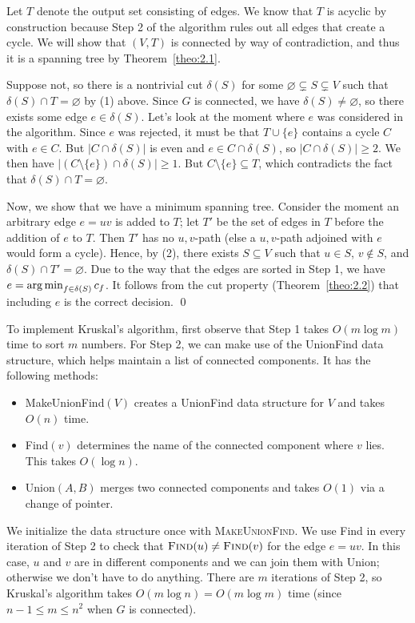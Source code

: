 \begin{pf}
    Let $T$ denote the output set consisting of edges. We know that $T$ is 
    acyclic by construction because Step 2 of the algorithm rules 
    out all edges that create a cycle. We will show that $(V, T)$ is 
    connected by way of contradiction, and thus it is a spanning tree 
    by Theorem~\ref{theo:2.1}.

    Suppose not, so there is a nontrivial cut $\delta(S)$ for some $\varnothing \subsetneq S 
    \subsetneq V$ such that $\delta(S) \cap T = \varnothing$ by (1) above. 
    Since $G$ is connected, we have $\delta(S) \neq \varnothing$, so 
    there exists some edge $e \in \delta(S)$. 
    Let's look at the moment where $e$ was considered in the algorithm. 
    Since $e$ was rejected, it must be that $T \cup \{e\}$ contains a cycle 
    $C$ with $e \in C$. But $|C \cap \delta(S)|$ is even and $e \in 
    C \cap \delta(S)$, so $|C \cap \delta(S)| \geq 2$. We then have 
    $|(C \setminus \{e\}) \cap \delta(S)| \geq 1$. But $C \setminus \{e\} 
    \subseteq T$, which contradicts the fact that $\delta(S) \cap T = \varnothing$. 

    Now, we show that we have a minimum spanning tree. Consider the moment 
    an arbitrary edge $e = uv$ is added to $T$; let $T'$ be the set of edges 
    in $T$ before the addition of $e$ to $T$. Then $T'$ has no $u, v$-path 
    (else a $u, v$-path adjoined with $e$ would form a cycle). Hence, 
    by (2), there exists $S \subseteq V$ such that $u \in S$, $v \notin S$, 
    and $\delta(S) \cap T' = \varnothing$. Due to the way that the edges 
    are sorted in Step 1, we have $e = \operatorname*{arg\,min}_{f\in\delta(S)} c_f$. 
    It follows from the cut property (Theorem~\ref{theo:2.2}) that including 
    $e$ is the correct decision. \qed
\end{pf}\vspace{-0.25cm}

To implement Kruskal's algorithm, first observe that Step 1 takes 
$O(m\log m)$ time to sort $m$ numbers. For Step 2, we can make use 
of the {\sc UnionFind} data structure, which helps maintain a 
list of connected components. It has the following methods:
\begin{itemize}
    \item {\sc MakeUnionFind}$(V)$ creates a {\sc UnionFind} data structure 
    for $V$ and takes $O(n)$ time. 
    \item {\sc Find}$(v)$ determines the name of the connected component where 
    $v$ lies. This takes $O(\log n)$. 
    \item {\sc Union}$(A, B)$ merges two connected components and takes 
    $O(1)$ via a change of pointer. 
\end{itemize}
We initialize the data structure once with \textsc{MakeUnionFind}.
We use {\sc Find} in every iteration of Step 2 to check that 
$\textsc{Find}(u) \neq \textsc{Find}(v)$ for the edge $e = uv$. In this 
case, $u$ and $v$ are in different components and we can join them with 
{\sc Union}; otherwise we don't have to do anything. There are $m$ iterations 
of Step 2, so Kruskal's algorithm takes $O(m\log n) = O(m\log m)$ 
time (since $n-1 \leq m \leq n^2$ when $G$ is connected).


